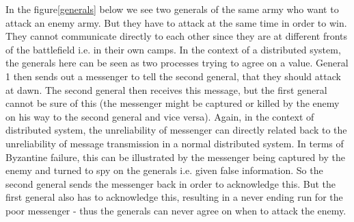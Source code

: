 In the figure\ref{generals} below we see two generals of the same army who want to attack an enemy army. But they have to attack at the same time in order to win. They cannot communicate directly to each other since they are at different fronts of the battlefield i.e. in their own camps. In the context of a distributed system, the generals here can be seen as two processes trying to agree on a value.
General 1 then sends out a messenger to tell the second general, that they should attack at dawn. The second general then receives this message, but the first general cannot be sure of this (the messenger might be captured or killed by the enemy on his way to the second general and vice versa). Again, in the context of distributed system, the unreliability of messenger can directly related back to the unreliability of message transmission in a normal distributed system. In terms of Byzantine failure, this can be illustrated by the messenger being captured by the enemy and turned to spy on the generals i.e. given false information.
So the second general sends the messenger back in order to acknowledge this. But the first general also has to acknowledge this, resulting in a never ending run for the poor messenger - thus the generals can never agree on when to attack the enemy.

